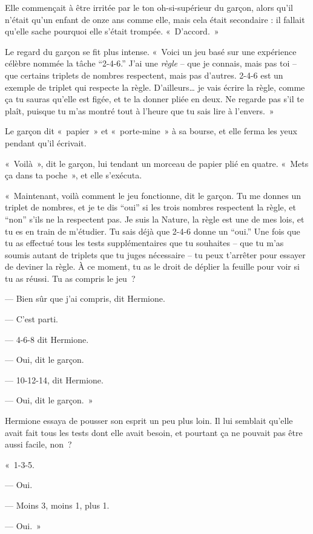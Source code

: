 Elle commençait à être irritée par le ton oh-si-supérieur du garçon, alors qu'il n'était qu'un enfant de onze ans comme elle, mais cela était secondaire : il fallait qu'elle sache pourquoi elle s'était trompée.
«~D'accord.~»

Le regard du garçon se fit plus intense.
«~Voici un jeu basé sur une expérience célèbre nommée la tâche “2-4-6.”
J'ai une \emph{règle} -- que je connais, mais pas toi -- que certains triplets de nombres respectent, mais pas d'autres.
2-4-6 est un exemple de triplet qui respecte la règle.
D'ailleurs… je vais écrire la règle, comme ça tu sauras qu'elle est figée, et te la donner pliée en deux.
Ne regarde pas s'il te plaît, puisque tu m'as montré tout à l'heure que tu sais lire à l'envers.~»

Le garçon dit «~papier~» et «~porte-mine~» à sa bourse, et elle ferma les yeux pendant qu'il écrivait.

«~Voilà~», dit le garçon, lui tendant un morceau de papier plié en quatre. «~Mets ça dans ta poche~», et elle s'exécuta.

«~Maintenant, voilà comment le jeu fonctionne, dit le garçon. Tu me donnes un triplet de nombres, et je te dis “oui” si les trois nombres respectent la règle, et “non” s'ils ne la respectent pas.
Je suis la Nature, la règle est une de mes lois, et tu es en train de m'étudier.
Tu sais déjà que 2-4-6 donne un “oui.”
Une fois que tu as effectué tous les tests supplémentaires que tu souhaites -- que tu m'as soumis autant de triplets que tu juges nécessaire -- tu peux t'arrêter pour essayer de deviner la règle.
À ce moment, tu as le droit de déplier la feuille pour voir si tu as réussi.
Tu as compris le jeu~?

--- Bien sûr que j'ai compris, dit Hermione.

--- C'est parti.

--- 4-6-8 dit Hermione.

--- Oui, dit le garçon.

--- 10-12-14, dit Hermione.

--- Oui, dit le garçon.~»

Hermione essaya de pousser son esprit un peu plus loin. Il lui semblait qu'elle avait fait tous les tests dont elle avait besoin, et pourtant ça ne pouvait pas être aussi facile, non~?

«~1-3-5.

--- Oui.

--- Moins 3, moins 1, plus 1.

--- Oui.~»

